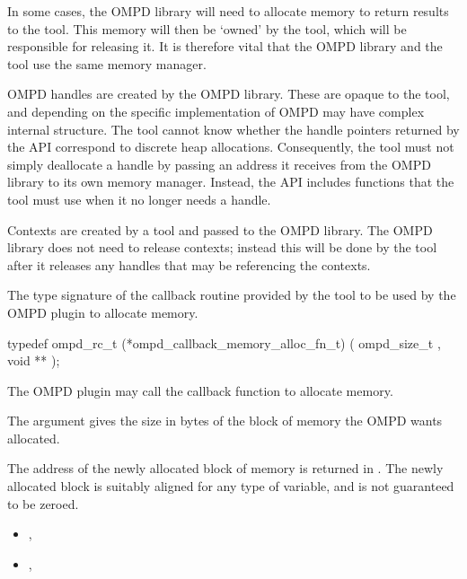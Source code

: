 In some cases, the OMPD library will need to allocate memory to return results to the
tool. This memory will then be `owned' by the tool, which will be responsible for releasing it. It is 
therefore vital that the OMPD library and the tool use the same memory manager.

OMPD handles are created by the OMPD library. These are opaque to the 
tool, and depending on the specific implementation of OMPD may have complex 
internal structure. The tool cannot know whether the handle pointers returned by the API 
correspond to discrete heap allocations. Consequently, the tool must not simply deallocate a 
handle by passing an address it receives from the OMPD library to its own memory manager. 
Instead, the API includes functions that the tool must use when it no longer needs a handle.

Contexts are created by a tool and passed to the OMPD library. The OMPD 
library does not need to release contexts; instead this will be done by the tool after it releases any 
handles that may be referencing the contexts.

\label{ompd:ompd_callback_memory_alloc_fn_t}

\summary
The type signature of the callback routine provided by the tool
to be used by the OMPD plugin to allocate memory.


\cspecificstart
\begin{ompSyntax}
typedef ompd_rc_t (*ompd_callback_memory_alloc_fn_t) (
  ompd_size_t   ,
  void **
);
\end{ompSyntax}
\cspecificend


\descr
The OMPD plugin may call the  callback function to allocate memory.

\argdesc
The argument  gives the size in bytes of the block of memory the
OMPD wants allocated.

The address of the newly allocated
block of memory is returned in .
The newly allocated block is suitably aligned for any type of variable,
and is not guaranteed to be zeroed.

\crossreferences
\begin{itemize}
\item
  , 
\item
  , 
\end{itemize}

